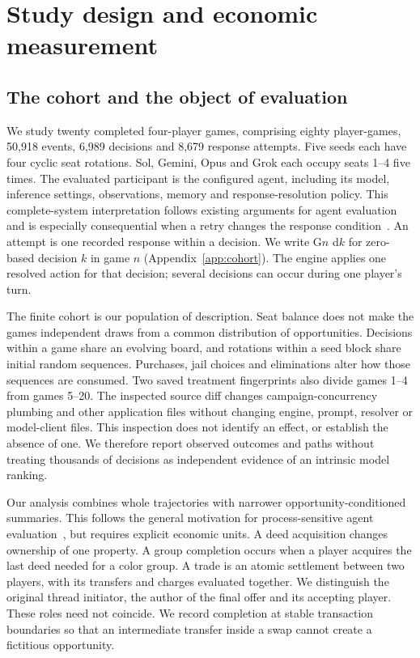 
\section{Study design and economic measurement}
\label{sec:sol-economic-methods}

\subsection{The cohort and the object of evaluation}

We study twenty completed four-player games, comprising eighty player-games, 50,918 events, 6,989 decisions and 8,679 response attempts. Five seeds each have four cyclic seat rotations. Sol, Gemini, Opus and Grok each occupy seats 1--4 five times. The evaluated participant is the configured agent, including its model, inference settings, observations, memory and response-resolution policy. This complete-system interpretation follows existing arguments for agent evaluation and is especially consequential when a retry changes the response condition~\cite{kapoor2026hal,zhang2026dece}. An attempt is one recorded response within a decision. We write G$n$ d$k$ for zero-based decision $k$ in game $n$ (Appendix~\ref{app:cohort}). The engine applies one resolved action for that decision; several decisions can occur during one player's turn.

The finite cohort is our population of description. Seat balance does not make the games independent draws from a common distribution of opportunities. Decisions within a game share an evolving board, and rotations within a seed block share initial random sequences. Purchases, jail choices and eliminations alter how those sequences are consumed. Two saved treatment fingerprints also divide games 1--4 from games 5--20. The inspected source diff changes campaign-concurrency plumbing and other application files without changing engine, prompt, resolver or model-client files. This inspection does not identify an effect, or establish the absence of one. We therefore report observed outcomes and paths without treating thousands of decisions as independent evidence of an intrinsic model ranking.

Our analysis combines whole trajectories with narrower opportunity-conditioned summaries. This follows the general motivation for process-sensitive agent evaluation~\cite{ma2024agentboard}, but requires explicit economic units. A deed acquisition changes ownership of one property. A group completion occurs when a player acquires the last deed needed for a color group. A trade is an atomic settlement between two players, with its transfers and charges evaluated together. We distinguish the original thread initiator, the author of the final offer and its accepting player. These roles need not coincide. We record completion at stable transaction boundaries so that an intermediate transfer inside a swap cannot create a fictitious opportunity.

